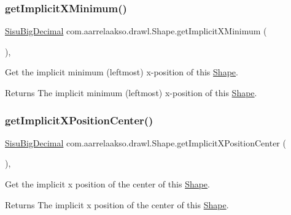 \subsubsection{\texorpdfstring{get\+Implicit\+X\+Minimum()}{getImplicitXMinimum()}}
{\footnotesize\ttfamily \hyperlink{classcom_1_1aarrelaakso_1_1drawl_1_1_sisu_big_decimal}{Sisu\+Big\+Decimal} com.\+aarrelaakso.\+drawl.\+Shape.\+get\+Implicit\+X\+Minimum (\begin{DoxyParamCaption}{ }\end{DoxyParamCaption})\hspace{0.3cm}{\ttfamily [protected]}, {\ttfamily [inherited]}}

Get the implicit minimum (leftmost) x-\/position of this \hyperlink{classcom_1_1aarrelaakso_1_1drawl_1_1_shape}{Shape}.

\begin{DoxyReturn}{Returns}
The implicit minimum (leftmost) x-\/position of this \hyperlink{classcom_1_1aarrelaakso_1_1drawl_1_1_shape}{Shape}. 
\end{DoxyReturn}
\mbox{\label{classcom_1_1aarrelaakso_1_1drawl_1_1_shape_a50c12c30790bd28ec0b71b58f59b1e96}} 
\subsubsection{\texorpdfstring{get\+Implicit\+X\+Position\+Center()}{getImplicitXPositionCenter()}}
{\footnotesize\ttfamily \hyperlink{classcom_1_1aarrelaakso_1_1drawl_1_1_sisu_big_decimal}{Sisu\+Big\+Decimal} com.\+aarrelaakso.\+drawl.\+Shape.\+get\+Implicit\+X\+Position\+Center (\begin{DoxyParamCaption}{ }\end{DoxyParamCaption})\hspace{0.3cm}{\ttfamily [protected]}, {\ttfamily [inherited]}}

Get the implicit x position of the center of this \hyperlink{classcom_1_1aarrelaakso_1_1drawl_1_1_shape}{Shape}.

\begin{DoxyReturn}{Returns}
The implicit x position of the center of this \hyperlink{classcom_1_1aarrelaakso_1_1drawl_1_1_shape}{Shape}. 
\end{DoxyReturn}
\mbox{\label{classcom_1_1aarrelaakso_1_1drawl_1_1_shape_ad9b2aee9937d5f034f7f4a2a1d979260}} 
